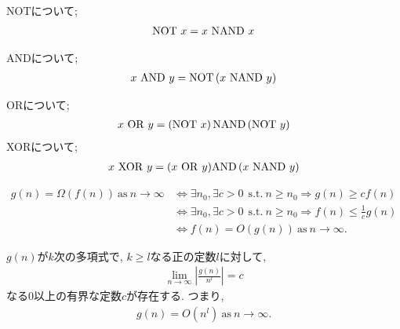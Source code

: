 \begin{ex}
    \label{ex3.5}
\end{ex}

\begin{ex}
    \label{ex3.6}
\end{ex}

\begin{ex}
    \label{ex3.7}
\end{ex}

\begin{ex}
    \label{ex3.8}
    NOTについて;
    \begin{align*}
        \mathrm{NOT}\  x = x\ \mathrm{NAND} \ x
    \end{align*}
    \par
    ANDについて;
    \begin{align*}
        x \ \mathrm{AND} \ y  = \mathrm{NOT} \left( x \ \mathrm{NAND} \ y \right)
    \end{align*}
    \par
    ORについて;
    \begin{align*}
        x \ \mathrm{OR} \ y = \left( \mathrm{NOT} \ x \right) \mathrm{NAND} \left( \mathrm{NOT} \ y \right)
    \end{align*}
    XORについて;
    \begin{align*}
        x \ \mathrm{XOR} \  y = (x \ \mathrm{OR} \ y) \mathrm{AND} \left( x\ \mathrm{NAND} \ y\right)
    \end{align*}
\end{ex}

\begin{ex}
    \label{ex3.9}
    \begin{align*}
        g(n) = \Omega{\left( f(n) \right)}
        \mathrm{\ as\ } n \to \infty
         & \Leftrightarrow
        \exists{n_0} ,\exists{c>0} \ \mathrm{\ s.t.\ }
        n \geq n_0 \Rightarrow g(n) \geq c f(n)
        \\
         & \Leftrightarrow
        \exists{n_0} ,\exists{c>0} \ \mathrm{\ s.t.\ }
        n \geq n_0 \Rightarrow f(n) \leq \frac{1}{c} g(n)
        \\
         & \Leftrightarrow
        f(n) = O{\left( g(n) \right)}
        \mathrm{\ as\ } n \to \infty.
    \end{align*}
\end{ex}

\begin{ex}
    \label{ex3.10}
    $g(n)$が$k$次の多項式で, $k\geq l$なる正の定数$l$に対して,
    \begin{align*}
        \lim_{n \to \infty}  \left|\frac{g(n)}{n^l}\right| = c
    \end{align*}
    なる0以上の有界な定数$c$が存在する. つまり,
    \begin{align*}
        g(n) = O\left(n^l\right)
        \mathrm{\ as\ } n \to \infty.
    \end{align*}
\end{ex}

